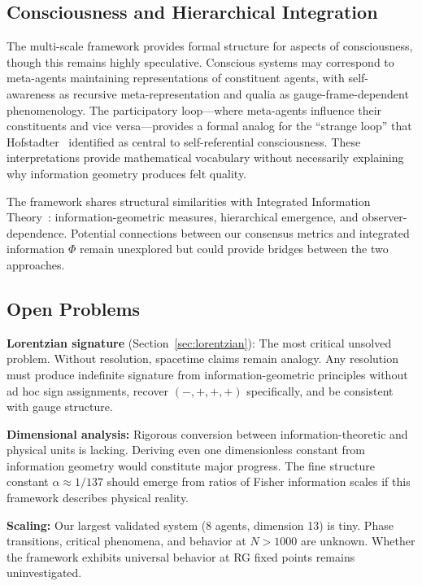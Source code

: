 \documentclass[11pt]{article}
\begin{document}
\subsection{Consciousness and Hierarchical Integration}

The multi-scale framework provides formal structure for aspects of consciousness, though this remains highly speculative. Conscious systems may correspond to meta-agents maintaining representations of constituent agents, with self-awareness as recursive meta-representation and qualia as gauge-frame-dependent phenomenology. The participatory loop---where meta-agents influence their constituents and vice versa---provides a formal analog for the ``strange loop'' that Hofstadter~\cite{Hofstadter1979} identified as central to self-referential consciousness. These interpretations provide mathematical vocabulary without necessarily explaining why information geometry produces felt quality.

The framework shares structural similarities with Integrated Information Theory~\cite{Tononi2008}: information-geometric measures, hierarchical emergence, and observer-dependence. Potential connections between our consensus metrics and integrated information $\Phi$ remain unexplored but could provide bridges between the two approaches.

\subsection{Open Problems}
\label{sec:open_problems}

\textbf{Lorentzian signature} (Section~\ref{sec:lorentzian}): The most critical unsolved problem. Without resolution, spacetime claims remain analogy. Any resolution must produce indefinite signature from information-geometric principles without ad hoc sign assignments, recover $(-,+,+,+)$ specifically, and be consistent with gauge structure.

\textbf{Dimensional analysis:} Rigorous conversion between information-theoretic and physical units is lacking. Deriving even one dimensionless constant from information geometry would constitute major progress. The fine structure constant $\alpha \approx 1/137$ should emerge from ratios of Fisher information scales if this framework describes physical reality.

\textbf{Scaling:} Our largest validated system (8 agents, dimension 13) is tiny. Phase transitions, critical phenomena, and behavior at $N > 1000$ are unknown. Whether the framework exhibits universal behavior at RG fixed points remains uninvestigated.
\end{document}
